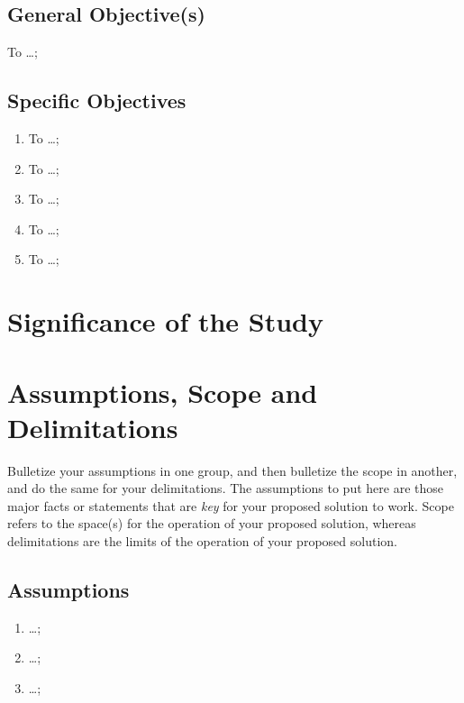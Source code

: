\subsection{General Objective(s)}
To \ldots;

\subsection{Specific Objectives}

\begin{enumerate}
	\item To  \ldots;

	\item To  \ldots;

	\item To  \ldots;

	\item To  \ldots;

	\item To  \ldots;
\end{enumerate}



\section{Significance of the Study}

\graytx{\blindtext}



\section{Assumptions, Scope and Delimitations}

Bulletize your assumptions in one group, and then bulletize the scope in another, and do the same for your delimitations. The assumptions to put here are those major facts or statements that are \textit{key} for your proposed solution to work. Scope refers to the space(s) for the operation of your proposed solution, whereas delimitations are the limits of the operation of your proposed solution.

\subsection{Assumptions}

\begin{enumerate}
	\item \ldots;

	\item \ldots;

	\item \ldots;
\end{enumerate}

